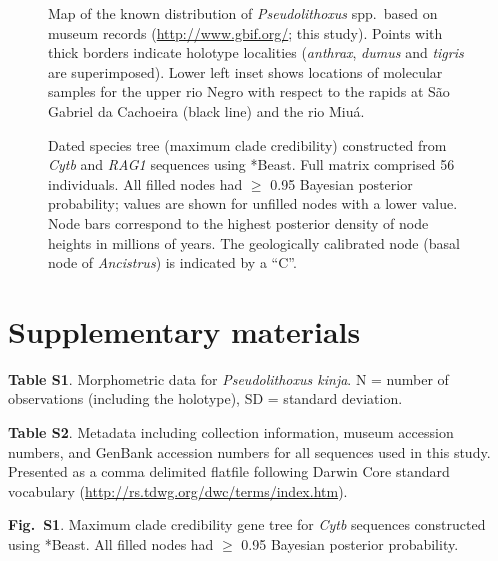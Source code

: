 \documentclass[12pt]{article}
\begin{document}
\begin{figure}[!htbp]
\caption{Map of the known distribution of \emph{Pseudolithoxus} spp.\ based on museum records (\href{http://www.gbif.org/}{http://www.gbif.org/}; this study). %
Points with thick borders indicate holotype localities (\emph{anthrax}, \emph{dumus} and \emph{tigris} are superimposed). %
 Lower left inset shows locations of molecular samples for the upper rio Negro with respect to the rapids at São Gabriel da Cachoeira (black line) and the rio Miuá.}
\begin{center}
\end{center}
\label{fig:map}
\end{figure}

\begin{figure}[!htbp]
\caption{Dated species tree (maximum clade credibility) constructed from \emph{Cytb} and \emph{RAG1} sequences using *Beast. %
Full matrix comprised 56 individuals. %
All filled nodes had $\geq$ 0.95 Bayesian posterior probability; values are shown for unfilled nodes with a lower value. %
Node bars correspond to the highest posterior density of node heights in millions of years. %
The geologically calibrated node (basal node of \emph{Ancistrus}) is indicated by a ``C''.}
\begin{center}
\end{center}
\label{fig:tree}
\end{figure}



\newpage
\section*{Supplementary materials}

\noindent \textbf{Table S1}. Morphometric data for \emph{Pseudolithoxus kinja}. %
N = number of observations (including the holotype), SD = standard deviation.%
\bigskip

\noindent \textbf{Table S2}. Metadata including collection information, museum accession numbers, and GenBank accession numbers for all sequences used in this study. Presented as a comma delimited flatfile following Darwin Core standard vocabulary (\href{http://rs.tdwg.org/dwc/terms/index.htm}{http://rs.tdwg.org/dwc/terms/index.htm}).%
\bigskip

\noindent \textbf{Fig.\ S1}. Maximum clade credibility gene tree for \emph{Cytb} sequences constructed using *Beast. %
All filled nodes had $\geq$ 0.95 Bayesian posterior probability.%
\bigskip
\end{document}
